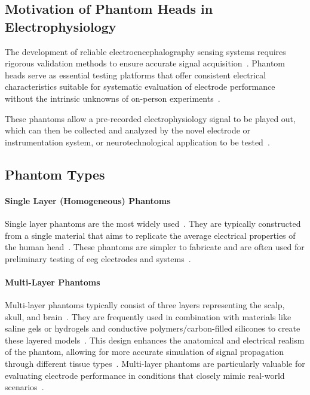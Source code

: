 \subsection{Motivation of Phantom Heads in Electrophysiology}\label{subsec:phantom_motivation}

The development of reliable electroencephalography sensing systems requires rigorous validation methods to ensure accurate signal acquisition~\cite{akor-2025}. Phantom heads serve as essential testing platforms that offer consistent electrical characteristics suitable for systematic evaluation of electrode performance without the intrinsic unknowns of on-person experiments~\cite{Owda2020}.

These phantoms allow a pre-recorded electrophysiology signal to be played out, which can then be collected and analyzed by the novel electrode or instrumentation system, or neurotechnological application to be tested~\cite{Owda2020}.

\subsection{Phantom Types}\label{subsec:phantom_designs}

\paragraph*{Single Layer (Homogeneous) Phantoms}

Single layer phantoms are the most widely used~\cite{Owda2020}. They are typically constructed from a single material that aims to replicate the average electrical properties of the human head~\cite{9475461}. These phantoms are simpler to fabricate and are often used for preliminary testing of \gls{eeg} electrodes and systems~\cite{Collier2012}.

\paragraph*{Multi-Layer Phantoms}
Multi-layer phantoms typically consist of three layers representing the scalp, skull, and brain~\cite{9475461}. They are frequently used in combination with materials like saline gels or hydrogels and conductive polymers/carbon-filled silicones to create these layered models~\cite{Owda2020}. This design enhances the anatomical and electrical realism of the phantom, allowing for more accurate simulation of signal propagation through different tissue types~\cite{Collier2012}. Multi-layer phantoms are particularly valuable for evaluating electrode performance in conditions that closely mimic real-world scenarios~\cite{akor-2025}.

